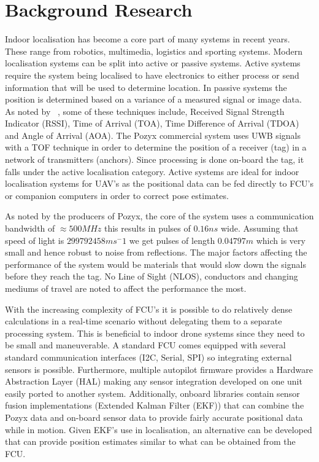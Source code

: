 \section{Background Research}\label{sec:background}
Indoor localisation has become a core part of many systems in recent years.
These range from robotics, multimedia, logistics and sporting systems.
Modern localisation systems can be split into active or passive systems.
Active systems require the system being localised to have electronics to either process or send information that will be used to determine location.
In passive systems the position is determined  based on a variance of a measured signal or image data.
As noted by ~\cite{deak2012survey}, some of these techniques include, Received Signal Strength Indicator (RSSI), Time of Arrival (TOA), Time Difference of Arrival (TDOA) and Angle of Arrival (AOA).
The Pozyx commercial system uses UWB signals with a TOF technique in order to determine the position of a receiver (tag) in a network of transmitters (anchors).
Since processing is done on-board the tag, it falls under the active localisation category.
Active systems are ideal for indoor localisation systems for UAV's as the positional data can be fed directly to FCU's or companion computers in order to correct pose estimates.

As noted by the producers of Pozyx, the core of the system uses a communication bandwidth of $\approx 500M Hz$ this results in pulses of $0.16ns$ wide.
Assuming that speed of light is $299792458ms^-1$ we get pulses of length $0.04797m$ which is very small and hence robust to noise from reflections.
The major factors affecting the performance of the system would be materials that would slow down the signals before they reach the tag.
No Line of Sight (NLOS), conductors and changing mediums of travel are noted to affect the performance the most.

With the increasing complexity of FCU's it is possible to do relatively dense calculations in a real-time scenario without delegating them to a separate processing system.
This is beneficial to indoor drone systems since they need to be small and maneuverable.
A standard FCU comes equipped with several standard communication interfaces (I2C, Serial, SPI) so integrating external sensors is possible.
Furthermore, multiple autopilot firmware provides a Hardware Abstraction Layer (HAL) making any sensor integration developed on one unit easily ported to another system.
Additionally, onboard libraries contain sensor fusion implementations (Extended Kalman Filter (EKF)) that can combine the Pozyx data and on-board sensor data to provide fairly accurate positional data while in motion.
Given EKF's use in localisation, an alternative can be developed that can provide position estimates similar to what can be obtained from the FCU.